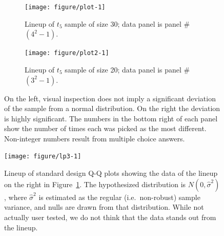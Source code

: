 \documentclass[12pt]{article}\usepackage[]{graphicx}\usepackage[]{color}
\newenvironment{knitrout}{}{} %
\newcommand{\hh}[1]{{\color{magenta} #1}}
\begin{document}
\clearpage
\begin{figure}[htb]
\begin{subfigure}[t]{.49\textwidth}
\caption{Lineup of $t_5$ sample of size 30; data panel is panel \#$(4^2-1)$.}

\texttt{[image: figure/plot-1]} 


\end{subfigure}
\begin{subfigure}[t]{.49\textwidth}
\caption{Lineup of $t_5$ sample of size 20; data panel is panel \#$(3^2-1)$.}

\texttt{[image: figure/plot2-1]} 


\end{subfigure}
\caption{\label{fig:lpnorm}  On the left, visual inspection does not imply  a significant deviation of the sample from a normal distribution. On the right the deviation is highly significant. The numbers in the bottom right of each panel show the number of times each was picked as the most different. %
Non-integer numbers result from multiple choice answers. %
}
\end{figure}
\afterpage{\clearpage}

\begin{figure}
\centering
\begin{knitrout}
\color{fgcolor}
\texttt{[image: figure/lp3-1]} 

\end{knitrout}
\caption{\label{fig:lp3} Lineup of standard design Q-Q plots showing the data of the lineup on the right in Figure~\ref{fig:lpnorm}. The hypothesized distribution is $N(0, \widehat{\sigma}^2)$, where $\widehat{\sigma}^2$ is estimated as the regular (i.e.~non-robust) sample variance, and nulls are drawn from that distribution. While not actually user tested, we do not think that the data stands out from the lineup.}
\end{figure}
\afterpage{\clearpage}
\end{document}
